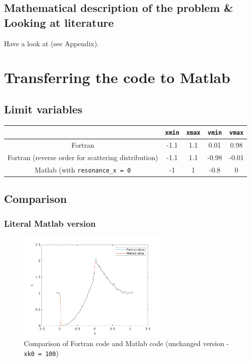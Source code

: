 \documentclass[../main/main.tex]{subfiles}
\begin{document}
\subsection{Mathematical description of the problem \&
Looking at literature}
Have a look at \cite{NoebauerUlrichM_2019MCRT} (see Appendix).

\newpage
\section{Transferring the code to Matlab}

\subsection{Limit variables}
\begin{center}
\centering
{\tabulinesep=1.5mm
\begin{tabu}{|c|c|c|c|c|}
\hline 
& \texttt{xmin} & \texttt{xmax} & \texttt{vmin} & \texttt{vmax} \\ \hline
Fortran & -1.1 &  1.1 & 0.01 & 0.98   \\ 
Fortran (reverse order for scattering distribution) & -1.1 &  1.1 & -0.98 & -0.01 \\ \hline
Matlab (with \texttt{resonance\_x = 0} & -1 & 1 & -0.8 & 0 \\ \hline
\end{tabu}}
\end{center}

\subsection{Comparison}

\subsubsection{Literal Matlab version}
\begin{figure}[!htp]
\centering
\includegraphics[width=0.65\textwidth]{../../two_resonance_lines/figures/compare_Matlab_Fortran_literally_100.png}
\caption{Comparison of Fortran code and Matlab code (unchanged version - \texttt{xk0 = 100})}
\label{variance_reduction_test}
\end{figure}
\end{document}
